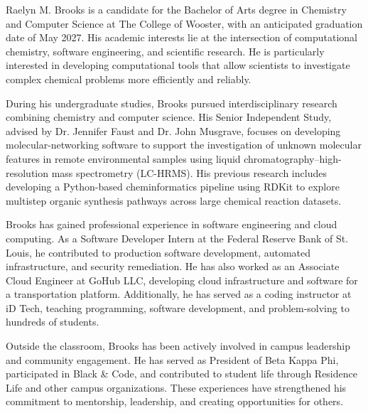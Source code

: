 \documentclass[palatino,code,picins,tikz,kaukecopyright,openright,lshortwooster,dropcaps,verbatim,index,oneside,euler,final]{woosterthesis}
\begin{document}
%                                                                                       
%                                                                                       

\begin{vita}

Raelyn M. Brooks is a candidate for the Bachelor of Arts degree
in Chemistry and Computer Science at The College of Wooster,
with an anticipated graduation date of May 2027. His academic
interests lie at the intersection of computational chemistry,
software engineering, and scientific research. He is particularly
interested in developing computational tools that allow scientists
to investigate complex chemical problems more efficiently and
reliably.

During his undergraduate studies, Brooks pursued interdisciplinary
research combining chemistry and computer science. His Senior
Independent Study, advised by Dr. Jennifer Faust and Dr. John
Musgrave, focuses on developing molecular-networking software
to support the investigation of unknown molecular features in
remote environmental samples using liquid chromatography--high-
resolution mass spectrometry (LC-HRMS). His previous research
includes developing a Python-based cheminformatics pipeline
using RDKit to explore multistep organic synthesis pathways
across large chemical reaction datasets.

Brooks has gained professional experience in software engineering
and cloud computing. As a Software Developer Intern at the
Federal Reserve Bank of St. Louis, he contributed to production
software development, automated infrastructure, and security
remediation. He has also worked as an Associate Cloud Engineer
at GoHub LLC, developing cloud infrastructure and software
for a transportation platform. Additionally, he has served
as a coding instructor at iD Tech, teaching programming,
software development, and problem-solving to hundreds of students.

Outside the classroom, Brooks has been actively involved in
campus leadership and community engagement. He has served as
President of Beta Kappa Phi, participated in Black \& Code,
and contributed to student life through Residence Life and
other campus organizations. These experiences have strengthened
his commitment to mentorship, leadership, and creating
opportunities for others.


\end{vita}
\end{document}
